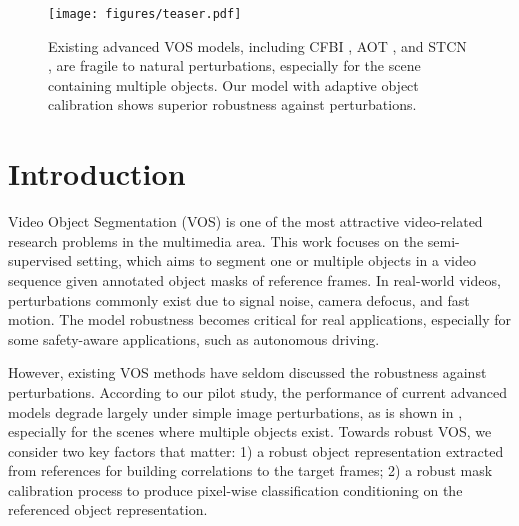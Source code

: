 \documentclass[sigconf]{acmart}
\begin{document}
\maketitle
\begin{figure}[ht]
	\centering
	\texttt{[image: figures/teaser.pdf]}
\caption{Existing advanced VOS models, including CFBI \cite{yang2020collaborative}, AOT \cite{yang2021associating}, and STCN \cite{cheng2021rethinking}, are fragile to natural perturbations, especially for the scene containing multiple objects. Our model with adaptive object calibration shows superior robustness against perturbations.}
\label{fig:teaser}   
\end{figure}





 
\section{Introduction}
\label{sec:introduction}


Video Object Segmentation (VOS) is one of the most attractive video-related research problems in the multimedia area. This work focuses on the semi-supervised setting, which aims to segment one or multiple objects in a video sequence given annotated object masks of reference frames. 
In real-world videos, perturbations commonly exist due to signal noise, camera defocus, and fast motion. The model robustness becomes critical for real applications, especially for some safety-aware applications, such as autonomous driving.


However, existing VOS methods have seldom discussed the robustness against perturbations.
According to our pilot study, the performance of current advanced models \cite{cheng2021rethinking,yang2021associating,yang2020collaborative} degrade largely under simple image perturbations, as is shown in \fig{\ref{fig:teaser}}, especially for the scenes where multiple objects exist. 
Towards robust VOS, we consider two key factors that matter: 1) a robust object representation extracted from references for building correlations to the target frames; 2) a robust mask calibration process to produce pixel-wise classification conditioning on the referenced object representation. 
\end{document}
